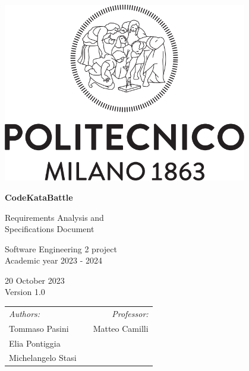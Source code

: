 
\begin{titlepage}
    \begin{center}
        \includegraphics[width=0.8\textwidth]{images/PoliMi_Logo.png}

        \vspace*{2cm}
        \textbf{\huge CodeKataBattle}

        \vspace{0.5cm}
        \LARGE Requirements Analysis and\\Specifications Document

        \vspace{1.5cm}
        \normalsize Software Engineering 2 project\\
        Academic year 2023 - 2024

        \vspace{0.5cm}
        20 October 2023\\
        Version 1.0

        \vspace{1cm}
        \small
        \begin{table}[b]
            \centering
            \begin{tabular}{l p{5.5cm} l}
                \textit{Authors:}   &  & \multicolumn{1}{r}{\textit{Professor:}} \\
                Tommaso Pasini      &  & \multicolumn{1}{r}{Matteo Camilli}      \\
                Elia Pontiggia      &  & \textbf{}                               \\
                Michelangelo Stasi  &  & \textbf{}
            \end{tabular}
        \end{table}

    \end{center}
\end{titlepage}